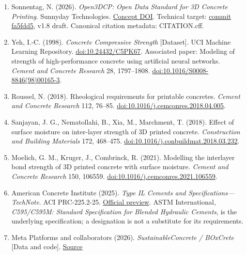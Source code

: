 \documentclass[
  american,
  11pt,
  letterpaper,
]{article}
\providecommand{\tightlist}{%
  \setlength{\itemsep}{0pt}\setlength{\parskip}{0pt}}
\renewcommand{\texttt}[1]{{\ttfamily\fontsize{9.5}{11}\selectfont\hyphenchar\font=-1 #1}}
\begin{document}
\begin{enumerate}
\def\labelenumi{\arabic{enumi}.}
\tightlist
\item
  Sonnentag, N. (2026). \emph{Open3DCP: Open Data Standard for 3D
  Concrete Printing}. Sunnyday Technologies.
  \href{https://doi.org/10.5281/zenodo.19647470}{Concept DOI}. Technical
  target:
  \href{https://github.com/sunnyday-technologies/Open3DCP/tree/fa5fdd5a513dee4554fd3fc01cab967a9ebd6041}{commit
  fa5fdd5}, v1.8 draft. Canonical citation metadata:
  \texttt{CITATION.cff}.
\item
  Yeh, I.-C. (1998). \emph{Concrete Compressive Strength} {[}Dataset{]}.
  UCI Machine Learning Repository.
  \href{https://doi.org/10.24432/C5PK67}{doi:10.24432/C5PK67}.
  Associated paper: Modeling of strength of high-performance concrete
  using artificial neural networks. \emph{Cement and Concrete Research}
  28, 1797--1808.
  \href{https://doi.org/10.1016/S0008-8846(98)00165-3}{doi:10.1016/S0008-8846(98)00165-3}.
\item
  Roussel, N. (2018). Rheological requirements for printable concretes.
  \emph{Cement and Concrete Research} 112, 76--85.
  \href{https://doi.org/10.1016/j.cemconres.2018.04.005}{doi:10.1016/j.cemconres.2018.04.005}.
\item
  Sanjayan, J. G., Nematollahi, B., Xia, M., Marchment, T. (2018).
  Effect of surface moisture on inter-layer strength of 3D printed
  concrete. \emph{Construction and Building Materials} 172, 468--475.
  \href{https://doi.org/10.1016/j.conbuildmat.2018.03.232}{doi:10.1016/j.conbuildmat.2018.03.232}.
\item
  Moelich, G. M., Kruger, J., Combrinck, R. (2021). Modelling the
  interlayer bond strength of 3D printed concrete with surface moisture.
  \emph{Cement and Concrete Research} 150, 106559.
  \href{https://doi.org/10.1016/j.cemconres.2021.106559}{doi:10.1016/j.cemconres.2021.106559}.
\item
  American Concrete Institute (2025). \emph{Type IL Cements and
  Specifications---TechNote}. ACI PRC-225.2-25.
  \href{https://www.concrete.org/Portals/0/Files/PDF/Previews/225.2-25_preview.pdf}{Official
  preview}. ASTM International, \emph{C595/C595M: Standard Specification
  for Blended Hydraulic Cements}, is the underlying specification; a
  designation is not a substitute for its requirements.
\item
  Meta Platforms and collaborators (2026). \emph{SustainableConcrete /
  BOxCrete} {[}Data and code{]}.
  \href{https://github.com/facebookresearch/SustainableConcrete}{Source
}
\end{enumerate}
\end{document}

